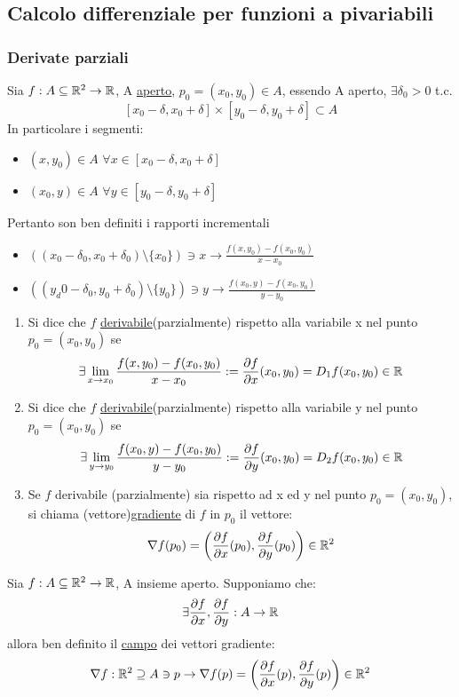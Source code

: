 \subsection{Calcolo differenziale per funzioni a pi\acu variabili}
\subsubsection{Derivate parziali}
Sia $f: A \subseteq \mathbb{R}^2 \to \mathbb{R}$, A \underline{aperto}, $p_0 = (x_0,y_0) \in A$, essendo A aperto, 
$\exists \delta_0 > 0$ t.c. 
$$[x_0-\delta, x_0+\delta]\times [y_0-\delta, y_0+\delta] \subset A$$
In particolare i segmenti:
\begin{itemize}
  \item $(x,y_0) \in A$ $\forall x \in [x_0-\delta, x_0+\delta]$
  \item $(x_0,y) \in A$ $\forall y \in [y_0-\delta, y_0+\delta]$
\end{itemize}
Pertanto son ben definiti i rapporti incrementali
\begin{itemize}
  \item $\left((x_0-\delta_0, x_0+\delta_0) \setminus \{x_0\}\right) \ni x \rightarrow \frac{f(x,y_0) - f(x_0,y_0)}{x-x_0}$
  \item $\left((y_d0-\delta_0, y_0+\delta_0) \setminus \{y_0\}\right) \ni y \rightarrow \frac{f(x_0,y) - f(x_0,y_0)}{y-y_0}$
\end{itemize}
\begin{definition}
  \begin{enumerate}
    \item Si dice che $f$ \ace \underline{derivabile}(parzialmente) rispetto alla variabile x nel punto $p_0 = (x_0,y_0)$ se 
          $$\exists \lim_{x \to x_0} \frac{f(x,y_0) - f(x_0,y_0)}{x-x_0} := \frac{\partial f}{\partial x}(x_0,y_0) = D_1 f(x_0,y_0) \in \mathbb{R}$$
    \item Si dice che $f$ \ace \underline{derivabile}(parzialmente) rispetto alla variabile y nel punto $p_0 = (x_0,y_0)$ se 
          $$\exists \lim_{y \to y_0} \frac{f(x_0,y) - f(x_0,y_0)}{y-y_0} := \frac{\partial f}{\partial y}(x_0,y_0) = D_2 f(x_0,y_0) \in \mathbb{R}$$
    \item Se $f$ \ace derivabile (parzialmente) sia rispetto ad x ed y nel punto $p_0 = (x_0,y_0)$, si chiama (vettore)\underline{gradiente} di $f$ in $p_0$
          il vettore:
          $$\nabla f(p_0) = \left(\frac{\partial f}{\partial x}(p_0), \frac{\partial f}{\partial y}(p_0)\right) \in \mathbb{R}^2$$
  \end{enumerate}
  Sia $f: A \subseteq \mathbb{R}^2 \to \mathbb{R}$, A insieme aperto. Supponiamo che:
  $$\exists \frac{\partial f}{\partial x},\frac{\partial f}{\partial y} : A \to \mathbb{R}$$
  allora \ace ben definito il \underline{campo} dei vettori gradiente:
  $$\nabla f : \mathbb{R}^2 \supseteq A \ni p \to \nabla f(p) = \left(\frac{\partial f}{\partial x}(p), \frac{\partial f}{\partial y}(p)\right) \in \mathbb{R}^2$$
\end{definition}
